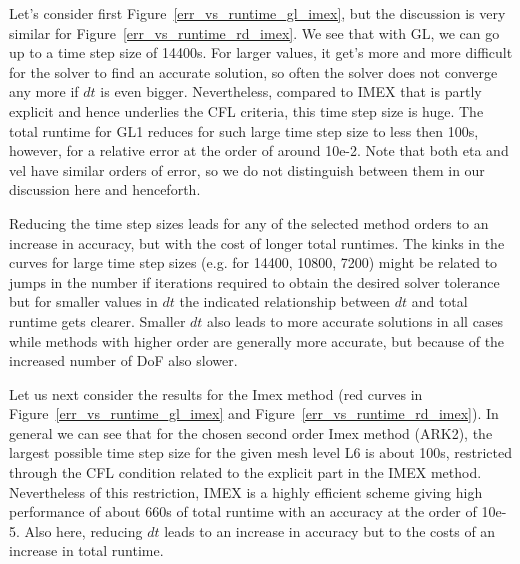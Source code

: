 \documentclass[a4paper, 12pt]{article}
\begin{document}
Let's consider first Figure~\ref{err_vs_runtime_gl_imex}, but the discussion is very similar for  Figure~\ref{err_vs_runtime_rd_imex}. We see that with GL, we can go up to a time step size of 14400s. For larger values, it get's more and more difficult for the solver to find an accurate solution, so often the solver does not converge any more if $dt$ is even bigger. Nevertheless, compared to IMEX that is partly explicit and hence underlies the CFL criteria, this time step size is huge. The total runtime for GL1 reduces for such large time step size to less then 100s, however, for a relative error at the order of around 10e-2. Note that both eta and vel have similar orders of error, so we do not distinguish between them in our discussion here and henceforth.

Reducing the time step sizes leads for any of the selected method orders to an increase in accuracy, but with the cost of longer total runtimes. The kinks in the curves for large time step sizes (e.g. for 14400, 10800, 7200) might be related to jumps in the number if iterations required to obtain the desired solver tolerance but for smaller values in $dt$ the indicated relationship between $dt$ and total runtime gets clearer. Smaller $dt$ also leads to more accurate solutions in all cases while methods with higher order are generally more accurate, but because of the increased number of DoF also slower.

Let us next consider the results for the Imex method (red curves in Figure~\ref{err_vs_runtime_gl_imex} and Figure~\ref{err_vs_runtime_rd_imex}). In general we can see that for the chosen second order Imex method (ARK2), the largest possible time step size for the given mesh level L6 is about 100s, restricted through the CFL condition related to the explicit part in the IMEX method. Nevertheless of this restriction, IMEX is a highly efficient scheme giving high performance of about 660s of total runtime with
an accuracy at the order of 10e-5. Also here, reducing $dt$ leads to an increase in accuracy but to the costs of an increase in total runtime.
\end{document}
